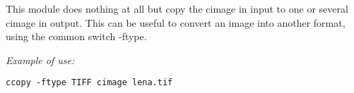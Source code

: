This module does nothing at all but copy the cimage in input
to one or several cimage in output.
This can be useful to convert an image into another format,
using the common switch -ftype.

\medskip

{\it Example of use:}
\begin{verbatim}
ccopy -ftype TIFF cimage lena.tif
\end{verbatim}

